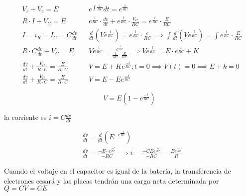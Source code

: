 \begin{align*}
	 & V_{r}+V_{c}=E                                           &  & e^{\int \frac{1}{RC}} dt=e^{\frac{t}{RC}}                                                                                                                                                \\
	 & R\cdot I+V_{C}=E                                        &  & e^{\frac{t}{RC}}\cdot \frac{dv}{dt}+e^{\frac{t}{RC}}\cdot \frac{V_{C}}{RC}=e^{\frac{t}{RC}}\cdot \frac{E}{RC}                                                                            \\
	 & I=i_{R}=I_{C}=C\frac{dv}{dt}                            &  & \frac{d}{dt} \left( Ve^{\frac{t}{RC}} \right )= e^{\frac{t}{RC}}\cdot \frac{e}{RC} \implies \int \frac{d}{dt} \left( Ve^{\frac{t}{RC}} \right )= \int e^{\frac{t}{RC}}\cdot \frac{E}{RC} \\
	 & R\cdot C \frac{dv}{dt}+V_{C}=E                          &  & Ve^{\frac{t}{RC}}= \frac{e^{\frac{t}{RC}}}{\frac{1}{RC}\cdot \frac{E}{RC}} \implies Ve^{\frac{t}{RC}}=E\cdot e^{\frac{t}{RC}}+K                                                          \\
	 & \frac{dv}{dt}+\frac{V_{C}}{R\cdot C}=\frac{E}{R\cdot C} &  & V=E+Ke^{\frac{-t}{RC}}; t=0 \implies V(t)=0 \implies E+k=0                                                                                                                               \\
	 & \frac{dv}{dt}+\frac{V_{C}}{R\cdot C}=\frac{E}{R\cdot C} &  & V=E-Ee^{\frac{-t}{RC}}
\end{align*}

\begin{equation}
	V=E \left( 1-e^{\frac{-t}{RC}} \right )
\end{equation}


la corriente es $i=C \frac{dv}{dt}$

\begin{align*}
	 & \frac{dv}{dt}=\frac{d}{dt} \left( E^{-e^\frac{-t}{RC}} \right)                                                               \\
	 & \frac{dv}{dt}=\frac{-E\cdot e^{\frac{-t}{RC}}}{-RC} \implies i=\frac{-CEe^{\frac{-t}{RC}}}{-RC}=\frac{Ee^{\frac{-t}{RC}}}{R}
\end{align*}

Cuando el voltaje en el capacitor es igual de la batería, la transferencia de electrones cesará y las placas tendrán una carga neta determinada por $Q=CV=CE$


